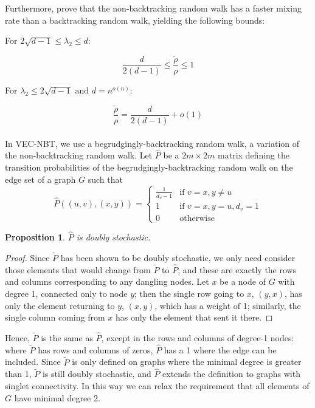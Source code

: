 \documentclass{article} %
\newtheorem{prop}{Proposition}
\begin{document}
Furthermore, \cite{NBT-Ihara, Alon} prove that the non-backtracking random walk has a faster mixing rate than a backtracking random walk, yielding the following bounds:

\begin{flushleft}
For $2\sqrt{d-1} \leq \lambda_2 \leq d:$
\end{flushleft}
$$\frac{d}{2(d-1)} \leq \frac{\tilde \rho}{\rho} \leq 1$$

\begin{flushleft}
For $\lambda_2 \leq 2\sqrt{d-1} \text{ and } d = n^{o(n)}:$
\end{flushleft}
$$\frac{\tilde \rho}{\rho} = \frac{d}{2(d-1)} + o(1)$$\\

In VEC-NBT, we use a begrudgingly-backtracking random walk, a variation of the non-backtracking random walk. Let $\hat P$ be a $2m \times 2m$ matrix defining the transition probabilities of the begrudgingly-backtracking random walk on the edge set of a graph $G$ such that
\[\hat P((u,v), (x,y)) = 
    \begin{cases} 
        \displaystyle\frac{1}{d_v-1} & \text{if } v = x, y \neq u\\
        1 & \text{if } v = x, y = u, d_v = 1 \\
        0 & \text{otherwise}
    \end{cases}
\]

\begin{prop}
$\hat P$ is doubly stochastic.
\end{prop}

\begin{proof}
Since $\tilde P$ has been shown to be doubly stochastic, we only need consider those elements that would change from $\tilde P$ to $\hat P$, and these are exactly the rows and columns corresponding to any dangling nodes. Let $x$ be a node of $G$ with degree 1, connected only to node $y$; then the single row going to $x$, $(y,x)$, has only the element returning to $y$, $(x,y)$, which has a weight of 1; similarly, the single column coming from $x$ has only the element that sent it there. 
\end{proof}

Hence, $\tilde P$ is the same as $\hat P$, except in the rows and columns of degree-1 nodes: where $\tilde P$ has rows and columns of zeros, $\hat P$ has a 1 where the edge can be included. Since $\tilde P$ is only defined on graphs where the minimal degree is greater than 1, $\tilde P$ is still doubly stochastic, and $\hat P$ extends the definition to graphs with singlet connectivity. In this way we can relax the requirement that all elements of $G$ have minimal degree 2.
\end{document}
